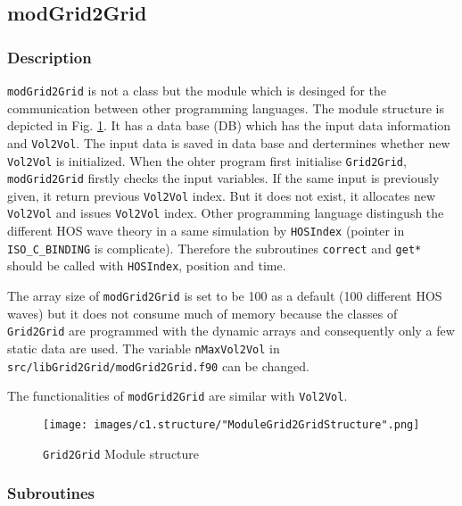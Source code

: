 \pagebreak
\subsection{modGrid2Grid}

\subsubsection{Description}

\texttt{modGrid2Grid} is not a class but the module which is desinged for the communication between other programming languages. The module structure is depicted in Fig. \ref{fig:modGrid2GridStructure}. It has a data base (DB) which has the input data information and \texttt{Vol2Vol}. The input data is saved in data base and dertermines whether new \texttt{Vol2Vol} is initialized. When the ohter program first initialise \texttt{Grid2Grid}, \texttt{modGrid2Grid} firstly checks the input variables. If the same input is previously given, it return previous \texttt{Vol2Vol} index. But it does not exist, it allocates new \texttt{Vol2Vol} and issues \texttt{Vol2Vol} index. Other programming language distingush the different HOS wave theory in a same simulation by \texttt{HOSIndex} (pointer in \texttt{ISO\_C\_BINDING} is complicate). Therefore the subroutines \texttt{correct} and \texttt{get*} should be called with \texttt{HOSIndex}, position and time.  

The array size of \texttt{modGrid2Grid} is set to be 100 as a default (100 different HOS waves) but it does not consume much of memory because the classes of \texttt{Grid2Grid} are programmed with the dynamic arrays and consequently only a few static data are used. The variable \texttt{nMaxVol2Vol} in \texttt{src/libGrid2Grid/modGrid2Grid.f90} can be changed. 

The functionalities of \texttt{modGrid2Grid} are similar with \texttt{Vol2Vol}. 

\vspace{0.5cm}

{
	\begin{figure} [H]
		\centering
		\texttt{[image: images/c1.structure/"ModuleGrid2GridStructure".png]}
		\vspace{0.5cm}
		\caption{\texttt{Grid2Grid} Module structure}
		\label{fig:modGrid2GridStructure}
	\end{figure}
}

\pagebreak
\subsubsection{Subroutines}	

